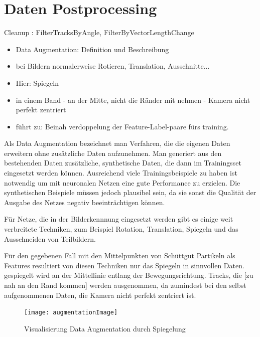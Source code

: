


\section{Daten Postprocessing}

Cleanup : FilterTracksByAngle, FilterByVectorLengthChange 


\begin{itemize}
	\item Data Augmentation: Definition und Beschreibung
	\item bei Bildern normalerweise Rotieren, Translation, Ausschnitte...
	\item Hier: Spiegeln
	\item in einem Band - an der Mitte, nicht die Ränder mit nehmen - Kamera nicht perfekt zentriert
	\item führt zu: Beinah verdoppelung der Feature-Label-paare fürs training.
\end{itemize}

\color{blue}
Als Data Augmentation bezeichnet man Verfahren, die die eigenen Daten erweitern ohne zusätzliche Daten aufzunehmen.
Man generiert aus den bestehenden Daten zusätzliche, synthetische Daten, die dann im Trainingsset eingesetzt werden können.
Ausreichend viele Trainingsbeispiele zu haben ist notwendig um mit neuronalen Netzen eine gute Performance zu erzielen.
Die synthetischen Beispiele müssen jedoch plausibel sein, da sie sonst die Qualität der Ausgabe des Netzes negativ beeinträchtigen können.

Für Netze, die in der Bilderkennnung eingesetzt werden gibt es einige weit verbreitete Techniken,
zum Beispiel Rotation, Translation, Spiegeln und das Ausschneiden von Teilbildern.

Für den gegebenen Fall mit den Mittelpunkten von Schüttgut Partikeln als Features resultiert von diesen Techniken nur das Spiegeln in sinnvollen Daten.
gespiegelt wird an der Mittellinie entlang der Bewegungsrichtung.
Tracks, die [zu nah an den Rand kommen] werden ausgenommen, da zumindest bei den selbst aufgenommenen Daten, die Kamera nicht perfekt zentriert ist.

\begin{figure}
	\centering
	\texttt{[image: augmentationImage]}
	\caption{Visualisierung Data Augmentation durch Spiegelung}
	\label{fig:dataAugm}
\end{figure}


